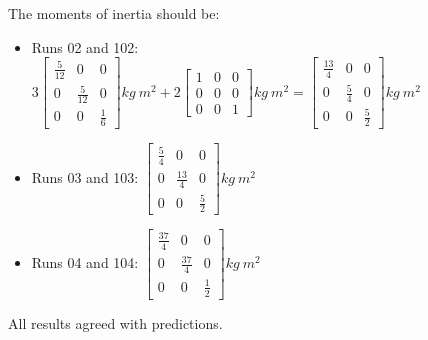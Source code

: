 \begin{description}
The moments of inertia should be:
\begin{itemize}
 \item Runs 02 and 102:  $3\begin{bmatrix} \frac{5}{12} & 0 & 0 \\ 0 & 
 \frac{5}{12} & 0 \\ 0 & 0 & \frac{1}{6} \end{bmatrix} kg ~ m^2 + 
 2\begin{bmatrix} 1 & 0 & 0 \\ 0 & 0 & 0 \\ 0 & 0 & 1 \end{bmatrix}kg ~ m^2  = 
 \begin{bmatrix} \frac{13}{4} & 0 & 0 \\ 0 & \frac{5}{4} & 0 \\ 0 & 0 & 
 \frac{5}{2} \end{bmatrix}kg ~ m^2$
 \item Runs 03 and 103:  $\begin{bmatrix} \frac{5}{4} & 0 & 0 \\ 0 & 
 \frac{13}{4} & 0 \\ 0 & 0 & \frac{5}{2} \end{bmatrix}kg ~ m^2$ 
 \item Runs 04 and 104:  $\begin{bmatrix} \frac{37}{4} & 0 & 0 \\ 0 & 
 \frac{37}{4} & 0 \\ 0 & 0 & \frac{1}{2} \end{bmatrix}kg ~ m^2$ 
\end{itemize}


All results agreed with predictions.
\end{description}




